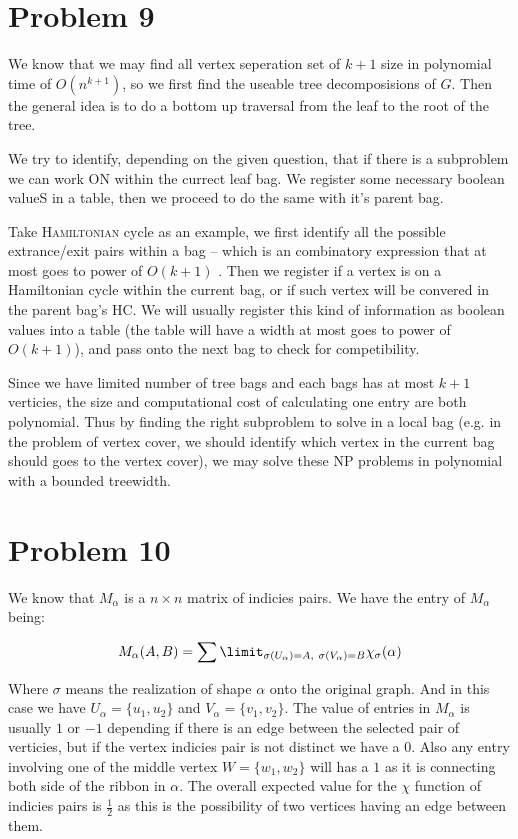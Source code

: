 \documentclass[11pt]{article}
\begin{document}
\section*{Problem 9}

We know that we may find all vertex seperation set of $k+1$ size in polynomial time of $O(n^{k+1})$, so we first find the useable tree decomposisions of $G$. Then the general idea is to do a bottom up traversal from the leaf to the root of the tree.

We try to identify, depending on the given question, that if there is a subproblem we can work ON within the currect leaf bag. We register some necessary boolean valueS in a table, then we proceed to do the same with it's parent bag.\newline

Take \textsc{Hamiltonian} cycle as an example, we first identify all the possible extrance/exit pairs within a bag -- which is an combinatory expression that at most goes to power of $O(k+1)$ . Then we register if a vertex is on a Hamiltonian cycle within the current bag, or if such vertex will be convered in the parent bag's HC. We will usually register this kind of information as boolean values into a table (the table will have a width at most goes to power of $O(k+1)$), and pass onto the next bag to check for competibility.

Since we have limited number of tree bags and each bags has at most $k+1$ verticies, the size and computational cost of calculating one entry are both polynomial. Thus by finding the right subproblem to solve in a local bag (e.g. in the problem of vertex cover, we should identify which vertex in the current bag should goes to the vertex cover), we may solve these NP problems in polynomial with a bounded treewidth.

\section*{Problem 10}

We know that $M_\alpha$ is a $n \times n$ matrix of indicies pairs. We have the entry of $M_\alpha$ being:

\begin{equation*}
    M_\alpha (A, B) = \sum\limit_{\sigma(U_\alpha) = A, \  \sigma(V_\alpha) = B} \chi_\sigma(\alpha)
\end{equation*}

Where $\sigma$ means the realization of shape $\alpha$ onto the original graph. And in this case we have $U_\alpha = \{u_1, u_2\}$ and $V_\alpha = \{v_1, v_2\}$. The value of entries in $M_\alpha$ is usually $1$ or $-1$ depending if there is an edge between the selected pair of verticies, but if the vertex indicies pair is not distinct we have a $0$. Also any entry involving one of the middle vertex $W = \{w_1, w_2\}$ will has a $1$ as it is connecting both side of the ribbon in $\alpha$. The overall expected value for the $\chi$ function of indicies pairs is $ \frac{1}{2}$ as this is the possibility of two vertices having an edge between them.\newline
\end{document}
